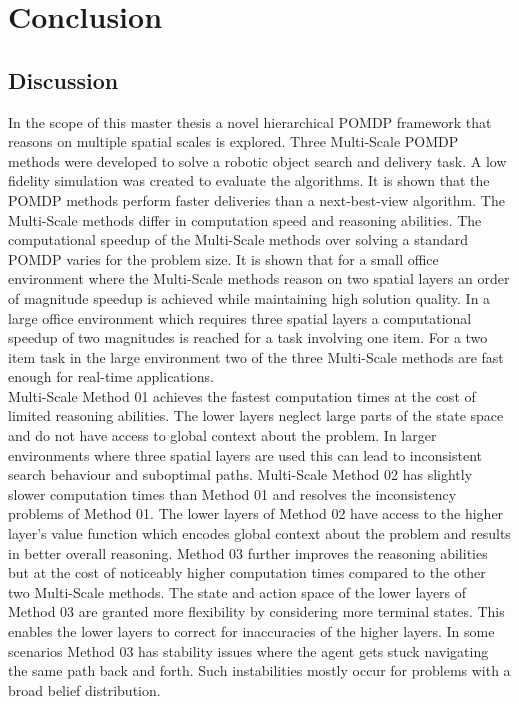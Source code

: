 \chapter{Conclusion}
\label{sec:conclusion}
\section{Discussion}
In the scope of this master thesis a novel hierarchical POMDP framework that reasons on multiple spatial scales is explored. Three Multi-Scale POMDP methods were developed to solve a robotic object search and delivery task. A low fidelity simulation was created to evaluate the algorithms. It is shown that the POMDP methods perform faster deliveries than a next-best-view algorithm. The Multi-Scale methods differ in computation speed and reasoning abilities. The computational speedup of the Multi-Scale methods over solving a standard POMDP varies for the problem size. It is shown that for a small office environment where the Multi-Scale methods reason on two spatial layers an order of magnitude speedup is achieved while maintaining high solution quality. In a large office environment which requires three spatial layers a computational speedup of two magnitudes is reached for a task involving one item. For a two item task in the large environment two of the three Multi-Scale methods are fast enough for real-time applications.\\

Multi-Scale Method 01 achieves the fastest computation times at the cost of limited reasoning abilities. The lower layers neglect large parts of the state space and do not have access to global context about the problem. In larger environments where three spatial layers are used this can lead to inconsistent search behaviour and suboptimal paths. Multi-Scale Method 02 has slightly slower computation times than Method 01 and resolves the inconsistency problems of Method 01. The lower layers of Method 02 have access to the higher layer's value function which encodes global context about the problem and results in better overall reasoning. Method 03 further improves the reasoning abilities but at the cost of noticeably higher computation times compared to the other two Multi-Scale methods. The state and action space of the lower layers of Method 03 are granted more flexibility by considering more terminal states. This enables the lower layers to correct for inaccuracies of the higher layers. In some scenarios Method 03 has stability issues where the agent gets stuck navigating the same path back and forth. Such instabilities mostly occur for problems with a broad belief distribution.


